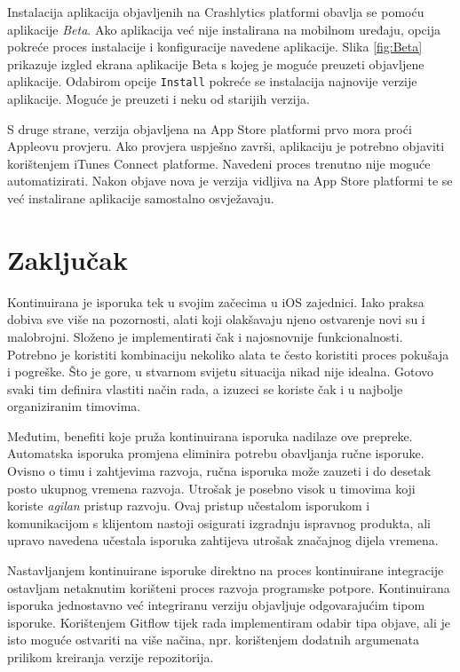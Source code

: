 \documentclass[times, utf8, diplomski, numeric]{fer}
\begin{document}
Instalacija aplikacija objavljenih na Crashlytics platformi obavlja se pomoću aplikacije \textit{Beta}. Ako aplikacija već nije instalirana na mobilnom uređaju, opcija pokreće proces instalacije i konfiguracije navedene aplikacije. Slika \ref{fig:Beta} prikazuje izgled ekrana aplikacije Beta s kojeg je moguće preuzeti objavljene aplikacije. Odabirom opcije \verb|Install| pokreće se instalacija najnovije verzije aplikacije. Moguće je preuzeti i neku od starijih verzija.

S druge strane, verzija objavljena na App Store platformi prvo mora proći Appleovu provjeru. Ako provjera uspješno završi, aplikaciju je potrebno objaviti korištenjem iTunes Connect platforme. Navedeni proces trenutno nije moguće automatizirati. Nakon objave nova je verzija vidljiva na App Store platformi te se već instalirane aplikacije samostalno osvježavaju.

\chapter{Zaključak}

Kontinuirana je isporuka tek u svojim začecima u iOS zajednici. Iako praksa dobiva sve više na pozornosti, alati koji olakšavaju njeno ostvarenje novi su i malobrojni. Složeno je implementirati čak i najosnovnije funkcionalnosti. Potrebno je koristiti kombinaciju nekoliko alata te često koristiti proces pokušaja i pogreške. Što je gore, u stvarnom svijetu situacija nikad nije idealna. Gotovo svaki tim definira vlastiti način rada, a izuzeci se koriste čak i u najbolje organiziranim timovima.

Međutim, benefiti koje pruža kontinuirana isporuka nadilaze ove prepreke. Automatska isporuka promjena eliminira potrebu obavljanja ručne isporuke. Ovisno o timu i zahtjevima razvoja, ručna isporuka može zauzeti i do desetak posto ukupnog vremena razvoja. Utrošak je posebno visok u timovima koji koriste \textit{agilan} pristup razvoju. Ovaj pristup učestalom isporukom i komunikacijom s klijentom nastoji osigurati izgradnju ispravnog produkta, ali upravo navedena učestala isporuka zahtijeva utrošak značajnog dijela vremena.

Nastavljanjem kontinuirane isporuke direktno na proces kontinuirane integracije ostavljam netaknutim korišteni proces razvoja programske potpore. Kontinuirana isporuka jednostavno već integriranu verziju objavljuje odgovarajućim tipom isporuke. Korištenjem Gitflow tijek rada implementiram odabir tipa objave, ali je isto moguće ostvariti na više načina, npr. korištenjem dodatnih argumenata prilikom kreiranja verzije repozitorija.
\end{document}
